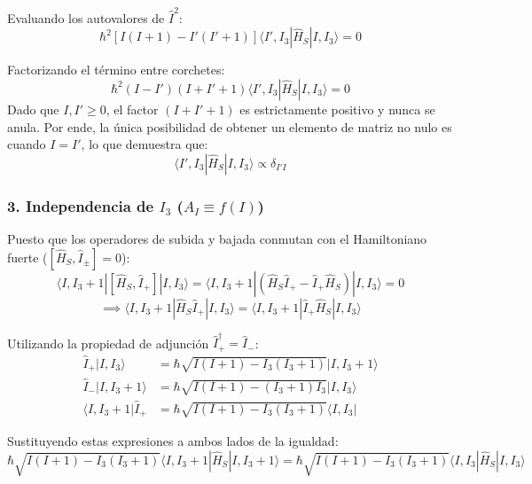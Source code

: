 Evaluando los autovalores de $\hat{I}^2$:
\begin{equation}
    \hbar^2 [I(I+1) - I'(I'+1)] \langle I', I_3 | \hat{H}_S | I, I_3 \rangle = 0
\end{equation}

Factorizando el término entre corchetes:
\begin{equation}
    \hbar^2 (I - I')(I + I' + 1) \langle I', I_3 | \hat{H}_S | I, I_3 \rangle = 0
\end{equation}
Dado que $I, I' \ge 0$, el factor $(I + I' + 1)$ es estrictamente positivo y nunca se anula. Por ende, la única posibilidad de obtener un elemento de matriz no nulo es cuando $I = I'$, lo que demuestra que:
\begin{equation}
    \langle I', I_3 | \hat{H}_S | I, I_3 \rangle \propto \delta_{I'I}
\end{equation}

\subsubsection*{3. Independencia de $I_3$ ($A_I \equiv f(I)$)}

Puesto que los operadores de subida y bajada conmutan con el Hamiltoniano fuerte ($[\hat{H}_S, \hat{I}_\pm] = 0$):
\begin{equation}
    \langle I, I_3 + 1 | [\hat{H}_S, \hat{I}_+] | I, I_3 \rangle = \langle I, I_3 + 1 | (\hat{H}_S \hat{I}_+ - \hat{I}_+ \hat{H}_S) | I, I_3 \rangle = 0
\end{equation}
\begin{equation}
    \implies \langle I, I_3 + 1 | \hat{H}_S \hat{I}_+ | I, I_3 \rangle = \langle I, I_3 + 1 | \hat{I}_+ \hat{H}_S | I, I_3 \rangle
\end{equation}

Utilizando la propiedad de adjunción $\hat{I}_+^\dagger = \hat{I}_-$:
\begin{align}
    \hat{I}_+ |I, I_3\rangle &= \hbar \sqrt{I(I+1) - I_3(I_3+1)} |I, I_3+1\rangle \\
    \hat{I}_- |I, I_3+1\rangle &= \hbar \sqrt{I(I+1) - (I_3+1)I_3} |I, I_3\rangle \\
    \langle I, I_3+1 | \hat{I}_+ &= \hbar \sqrt{I(I+1) - I_3(I_3+1)} \langle I, I_3|
\end{align}

Sustituyendo estas expresiones a ambos lados de la igualdad:
\begin{equation}
    \hbar \sqrt{I(I+1) - I_3(I_3+1)} \langle I, I_3+1 | \hat{H}_S | I, I_3+1 \rangle = \hbar \sqrt{I(I+1) - I_3(I_3+1)} \langle I, I_3 | \hat{H}_S | I, I_3 \rangle
\end{equation}

